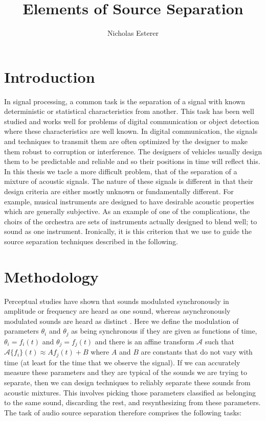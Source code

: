 \documentclass[letterpaper,12pt]{report}
\begin{document}
\author{Nicholas Esterer}
\title{Elements of Source Separation}
\maketitle
\tableofcontents

\section{Introduction}
In signal processing, a common task is the separation of a signal with known
deterministic or statistical characteristics from another. This task has been
well studied \cite{kay1993fundamentals} \cite{hayes2009statistical}
\cite{poor2013introduction} and works well for problems of digital communication
or object detection where these characteristics are well known. In digital
communication, the signals and techniques to transmit them are often optimized
by the designer to make them robust to corruption or interference. The designers
of vehicles usually design them to be predictable and reliable and so their
positions in time will reflect this. In this thesis we tacle a more difficult
problem, that of the separation of a mixture of acoustic signals. The nature of
these signals is different in that their design criteria are either
mostly unknown or fundamentally different. For example, musical instruments are
designed to have desirable acoustic properties which are generally subjective.
As an example of one of the complications, the choirs of the orchestra are sets
of instruments actually designed to blend well; to sound as one instrument.
Ironically, it is this criterion that we use to guide the source separation
techniques described in the following.

\section{Methodology}
Perceptual studies have shown that sounds modulated synchronously in amplitude
or frequency are heard as one sound, whereas asynchronously modulated sounds are
heard as distinct \cite{mcadams1989segregation} \cite{marin1991segregation}.
Here we define the modulation of parameters $\theta_i$ and $\theta_j$ as being
synchronous if they are given as functions of time, $\theta_i=f_i(t)$ and
$\theta_j=f_j(t)$ and there is an affine transform $\mathscr{A}$ such that
$\mathscr{A}\{f_i\}(t) \approx A f_j(t) + B$ where $A$ and $B$ are constants
that do not vary with time (at least for the time that we observe the signal).
If we can accurately measure these parameters and they are typical of the sounds
we are trying to separate, then we can design techniques to reliably separate
these sounds from acoustic mixtures. This involves picking those parameters
classified as belonging to the same sound, discarding the rest, and
resynthesizing from these parameters. The task of audio source separation
therefore comprises the following tasks:
\end{document}
